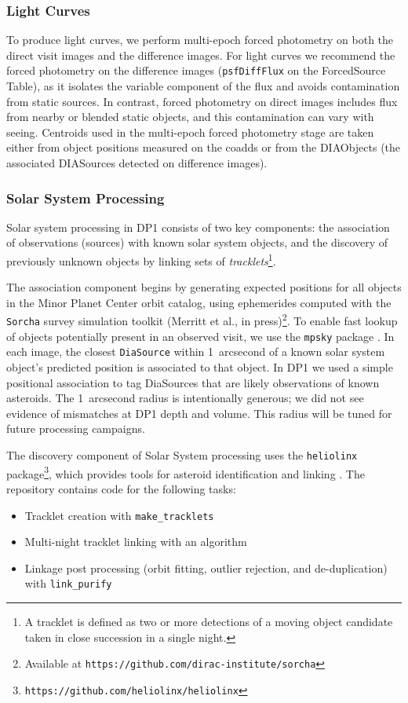 \subsubsection{Light Curves}
\label{sssec:lightcurves}
To produce light curves, we perform multi-epoch \gls{forced photometry} on both the direct visit images and the difference images.
For light curves we recommend the \gls{forced photometry} on the difference images (\texttt{psfDiffFlux} on the ForcedSource Table), as it isolates the variable component of the flux and avoids contamination from static sources.
In contrast, \gls{forced photometry} on direct images includes flux from nearby or blended static objects, and this contamination can vary with seeing.
Centroids used in the multi-epoch \gls{forced photometry} stage are taken either from object positions measured on the coadds or from the DIAObjects (the associated DIASources detected on difference images).

\subsubsection{Solar System Processing}
\label{sec:drp:solsys}

Solar system processing in \gls{DP1} consists of two key components: the association of observations (sources) with known solar system objects, and the discovery of previously unknown objects by linking sets of
{\em tracklets}\footnote{A tracklet is defined as two or more detections of a moving object candidate taken in close succession in a single night.}.

The association component begins by generating expected positions for all objects in the Minor Planet Center orbit catalog, using ephemerides computed with the \texttt{Sorcha} survey simulation toolkit (Merritt et al., in press)\footnote{Available at \nolinkurl{https://github.com/dirac-institute/sorcha}}.
To enable fast lookup of objects potentially present in an observed visit, we use the \texttt{mpsky} package \citep{mpsky}.
In each image, the closest \texttt{DiaSource} within 1~arcsecond of a known solar system object's predicted position is associated to that object.
In \gls{DP1} we used a simple positional association to tag DiaSources that are likely observations of known asteroids.
The 1~arcsecond radius is intentionally generous;  we did not see evidence of mismatches at DP1 depth and volume.
This radius will be tuned for future processing campaigns.

The discovery component of Solar System processing uses the \texttt{heliolinx} package\footnote{\nolinkurl{https://github.com/heliolinx/heliolinx}}, which provides tools for asteroid identification and linking \citep{heliolinx}.
The repository contains code for the following tasks:
\begin{itemize}
    \item Tracklet creation with \texttt{make\_tracklets}
    \item Multi-night \gls{tracklet} linking with an algorithm
    \item Linkage post processing (orbit fitting, outlier rejection, and de-duplication) with \texttt{link\_purify}
\end{itemize}

